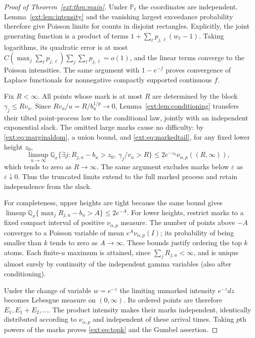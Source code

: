 \documentclass[11pt]{article}
\theoremstyle{definition}
\theoremstyle{remark}
\begin{document}
\begin{proof}[Proof of Theorem~\ref{ext:thm:main}]
Under $\mathbb P_t$ the coordinates are independent.
Lemma~\ref{ext:lem:intensity} and the vanishing largest exceedance
probability therefore give Poisson limits for counts in disjoint
rectangles.  Explicitly, the joint generating function is a product of
terms $1+\sum_\ell p_{j,\ell}(w_\ell-1)$.  Taking logarithms, its
quadratic error is at most
$C(\max_j\sum_\ell p_{j,\ell})\sum_j\sum_\ell p_{j,\ell}=o(1)$,
and the linear terms converge to the Poisson intensities.
The same argument with $1-e^{-f}$ proves convergence of Laplace
functionals for nonnegative compactly supported continuous $f$.

Fix $R<\infty$.  All points whose mark is at most $R$ are determined by
the block $\gamma_j\le Rv_u$.  Since
$Rv_u/u=R/b_u^{1/p}\to0$, Lemma~\ref{ext:lem:conditioning} transfers
their tilted point-process law to the conditional law, jointly with an
independent exponential slack.
The omitted large marks cause no difficulty: by
\eqref{ext:eq:marginaldom}, a union bound, and
\eqref{ext:eq:markedtail}, for any fixed lower height $z_0$,
\[
 \limsup_{u\to\infty}\mathbb Q_x
 \{\exists j:R_{j,u}-b_u>z_0,\ \gamma_j/v_u>R\}
 \le2e^{-z_0}\nu_{\alpha,p}((R,\infty)),
\]
which tends to zero as $R\to\infty$.  The same argument excludes marks
below $\varepsilon$ as $\varepsilon\downarrow0$.  Thus the truncated
limits extend to the full marked process and retain independence from
the slack.

For completeness, upper heights are tight because the same bound gives
$\limsup\mathbb Q_x\{\max_jR_{j,u}-b_u>A\}\le2e^{-A}$.
For lower heights, restrict marks to a fixed compact interval of
positive $\nu_{\alpha,p}$ measure.  The number of points above $-A$
converges to a Poisson variable of mean
$e^A\nu_{\alpha,p}(I)$; its probability of being smaller than $k$
tends to zero as $A\to\infty$.  These bounds justify ordering the top
$k$ atoms.  Each finite-$u$ maximum is attained, since
$\sum_jR_{j,u}<\infty$, and is unique almost surely by continuity of
the independent gamma variables (also after conditioning).

Under the change of variable $w=e^{-z}$ the limiting unmarked intensity
$e^{-z}dz$ becomes Lebesgue measure on $(0,\infty)$.
Its ordered points are therefore $E_1,E_1+E_2,\ldots$.
The product intensity makes their marks independent, identically
distributed according to $\nu_{\alpha,p}$ and independent of these
arrival times.  Taking $p$th powers of the marks proves
\eqref{ext:eq:topk} and the Gumbel assertion.
\end{proof}
\end{document}
